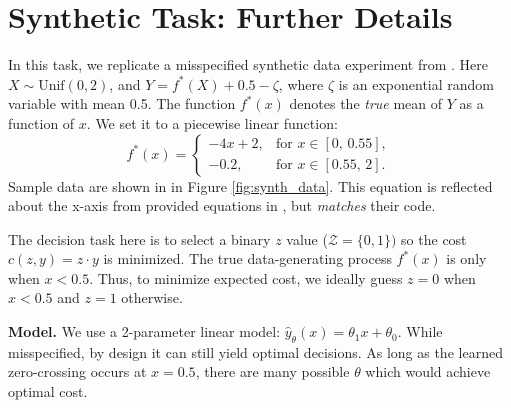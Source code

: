 \section{Synthetic Task: Further Details}
\label{app:synth}

In this task, we replicate a misspecified synthetic data experiment from \citet{huang2024decisionfocusedPG}. 
Here $X \sim \text{Unif}(0,2)$, and $Y = f^*(X)+ 0.5 - \zeta $, where $\zeta$ is an exponential random variable with mean 0.5. The function $f^*(x)$ denotes the \emph{true} mean of $Y$ as a function of $x$. We set it to a piecewise linear function:
\begin{equation}
    f^*(x) =
\begin{cases}
-4x + 2, & \text{for } x \in [0,\,0.55], \\
-0.2, & \text{for } x \in [0.55,\,2].
\end{cases}
\end{equation}
Sample data are shown in in Figure \ref{fig:synth_data}.
This equation is reflected about the x-axis from provided equations in \citeauthor{huang2024decisionfocusedPG}, but \emph{matches}  their code. %

The decision task here is to select a binary $z$ value ($\mathcal{Z} = \{ 0, 1\})$ so the cost $c(z, y) {=} z \cdot y$ is minimized. The true data-generating process $f^*(x)$ is only  when $x < 0.5$. Thus, to minimize expected cost, we ideally guess $z=0$ when $x < 0.5$ and $z=1$ otherwise.

\textbf{Model.} We use a 2-parameter linear model: $\hat{y}_{\theta}(x) = \theta_1 x + \theta_0$. While misspecified, by design it can still yield optimal decisions. As long as the learned zero-crossing occurs at $x=0.5$, there are many possible $\theta$ which would achieve optimal cost.
